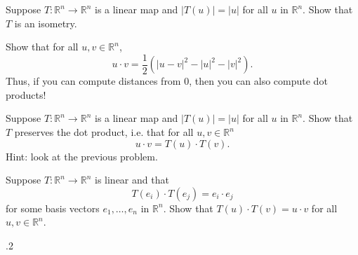 \documentclass[minion]{homework}
\newcommand{\Reals}{\mathbb{R}}
\begin{document}
\begin{problems}
\problem Suppose $T:\Reals^n\to\Reals^n$ is a linear map and
$|T(u)|=|u|$ for all $u$ in $\Reals^n$.  Show that $T$ is an isometry.

\problem Show that for all $u,v\in\Reals^n$,
\[
u\cdot v = \frac12 \left(|u-v|^2-|u|^2-|v|^2\right).
\]
Thus, if you can compute distances from $0$, then you can also compute dot products!


\problem Suppose $T:\Reals^n\to\Reals^n$ is a linear map and
$|T(u)|=|u|$ for all $u$ in $\Reals^n$.  Show that $T$ preserves
the dot product, i.e. that for all $u,v\in\Reals^n$
\[
u\cdot v = T(u)\cdot T(v).
\]
Hint: look at the previous problem.

\problem Suppose $T:\Reals^n\to\Reals^n$ is linear and that 
\[
T(e_i)\cdot T(e_j) = e_i\cdot e_j
\]
for some basis vectors $e_1,\ldots,e_n$ in $\Reals^n$.  Show that
$T(u)\cdot T(v)=u\cdot v$ for all $u,v\in\Reals^n$.

.2


\end{problems}
\end{document}
